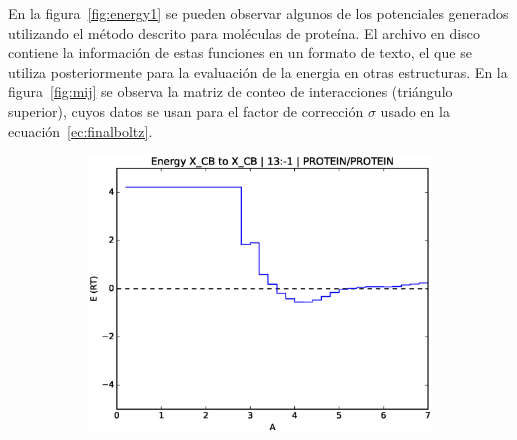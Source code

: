 \par
En la figura~\ref{fig:energy1} se pueden observar algunos de los potenciales generados utilizando el método descrito para moléculas de proteína. 
El archivo en disco contiene la información de estas funciones en un formato de texto, el que se utiliza posteriormente para la evaluación de la energia en otras estructuras.
En la figura~\ref{fig:mij} se observa la matriz de conteo de interacciones (triángulo superior), cuyos datos se usan para el factor de corrección $\sigma$ usado en la ecuación~\ref{ec:finalboltz}.
\clearpage
\begin{figure}[p]
\centering
\begin{subfigure}{.8\textwidth}
\centering
\includegraphics[width=\textwidth]{figures/prot_pot/eps_graphs/cb2cb.eps}
\caption{}
\end{subfigure}


\end{figure}
